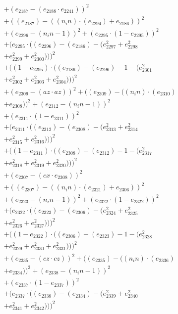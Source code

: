 \documentclass[10pt, a4paper]{article}
\begin{document}
\begin{small}
\begin{align*}
& + (e_{2187} - (e_{2188}  \cdot  e_{2241}))^{2} \\
& + ((e_{2187}) - ((n_in)  \cdot  (e_{2294}) + e_{2186}))^{2} \\
& + (e_{2296} - (n_in - 1))^{2} + (e_{2295}  \cdot  (1 - e_{2295}))^{2} \\
& + (e_{2295}  \cdot  ((e_{2296}) - (e_{2186}) - (e_{2297}^{2} + e_{2298}^{2} \\
& + e_{2299}^{2} + e_{2300}^{2})))^{2} \\
& + ((1 - e_{2295})  \cdot  ((e_{2186}) - (e_{2296}) - 1 - (e_{2301}^{2} \\
& + e_{2302}^{2} + e_{2303}^{2} + e_{2304}^{2})))^{2} \\
& + (e_{2309} - (az  \cdot  az))^{2} + ((e_{2309}) - ((n_in)  \cdot  (e_{2310}) \\
& + e_{2308}))^{2} + (e_{2312} - (n_in - 1))^{2} \\
& + (e_{2311}  \cdot  (1 - e_{2311}))^{2} \\
& + (e_{2311}  \cdot  ((e_{2312}) - (e_{2308}) - (e_{2313}^{2} + e_{2314}^{2} \\
& + e_{2315}^{2} + e_{2316}^{2})))^{2} \\
& + ((1 - e_{2311})  \cdot  ((e_{2308}) - (e_{2312}) - 1 - (e_{2317}^{2} \\
& + e_{2318}^{2} + e_{2319}^{2} + e_{2320}^{2})))^{2} \\
& + (e_{2307} - (cx  \cdot  e_{2308}))^{2} \\
& + ((e_{2307}) - ((n_in)  \cdot  (e_{2321}) + e_{2306}))^{2} \\
& + (e_{2323} - (n_in - 1))^{2} + (e_{2322}  \cdot  (1 - e_{2322}))^{2} \\
& + (e_{2322}  \cdot  ((e_{2323}) - (e_{2306}) - (e_{2324}^{2} + e_{2325}^{2} \\
& + e_{2326}^{2} + e_{2327}^{2})))^{2} \\
& + ((1 - e_{2322})  \cdot  ((e_{2306}) - (e_{2323}) - 1 - (e_{2328}^{2} \\
& + e_{2329}^{2} + e_{2330}^{2} + e_{2331}^{2})))^{2} \\
& + (e_{2335} - (cz  \cdot  cz))^{2} + ((e_{2335}) - ((n_in)  \cdot  (e_{2336}) \\
& + e_{2334}))^{2} + (e_{2338} - (n_in - 1))^{2} \\
& + (e_{2337}  \cdot  (1 - e_{2337}))^{2} \\
& + (e_{2337}  \cdot  ((e_{2338}) - (e_{2334}) - (e_{2339}^{2} + e_{2340}^{2} \\
& + e_{2341}^{2} + e_{2342}^{2})))^{2} \\

\end{align*}
\end{small}
\end{document}
